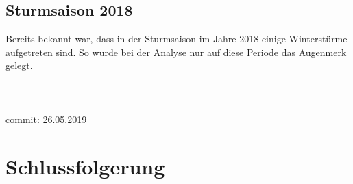 \begin{refsection}
\subsection{Sturmsaison 2018}
Bereits bekannt war, dass in der Sturmsaison im Jahre 2018 einige Winterstürme aufgetreten sind.
So wurde bei der Analyse nur auf diese Periode das Augenmerk gelegt.
\\
\\
\\
\\
commit: 26.05.2019





\section{Schlussfolgerung}

\printbibliography[heading=subbibliography]
\end{refsection}
